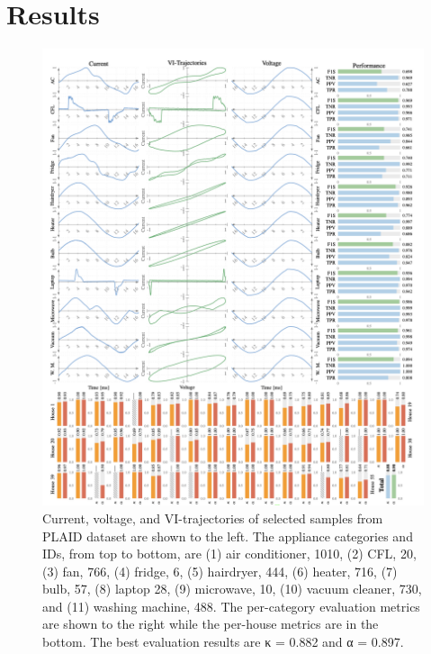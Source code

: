 \documentclass[11pt, a4paper]{article} %
\begin{document}
\section{Results}
\begin{figure}[htpb!] %
    \centering %
    \includegraphics[scale=0.8]{figure/results.png} %
    \caption{Current, voltage, and VI-trajectories of selected samples from PLAID dataset \cite{plaid} are shown to the left. The appliance categories and IDs, from top to bottom, are (1) air conditioner, 1010, (2) CFL, 20, (3) fan, 766, (4) fridge, 6, (5) hairdryer, 444, (6) heater, 716, (7) bulb, 57, (8) laptop 28, (9) microwave, 10, (10) vacuum cleaner, 730, and (11) washing machine, 488. The per-category evaluation metrics are shown to the right while the per-house metrics are in the bottom. The best evaluation results are κ = 0.882 and α = 0.897.\cite{barsim2018neural}} %
    \label{fig:my_label} %
\end{figure}
\end{document}
